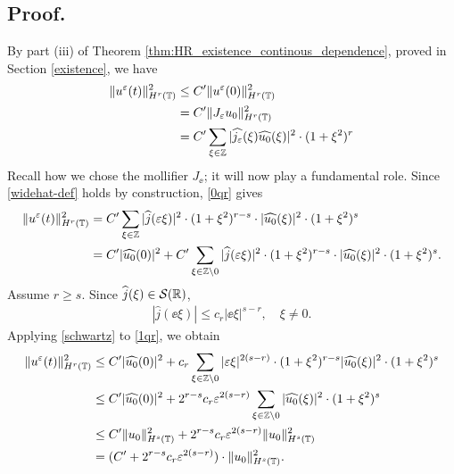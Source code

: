 \subsection{ Proof.} By part (iii) of Theorem
\ref{thm:HR_existence_continous_dependence}, proved in Section
\ref{existence}, we have
\begin{equation}
	\begin{split}
		\|u^\varepsilon(t) \|_{H^r(\mathbb{T})}^2
		& \le C' \|u^\varepsilon (0)\|_{H^r(\mathbb{T})}^2
		\\
		& = C' \|J_\varepsilon u_0\|_{H^r(\mathbb{T})}^2
		\\
		& = C' \sum_{\xi \in \mathbb{Z}} |\widehat{j_\varepsilon} (\xi) \widehat{u_0}(\xi)
		|^2 \cdot (1 + \xi^2)^r
		\label{0qr}
	\end{split}
\end{equation}
Recall how we chose the mollifier $J_\ee$; it will now play a fundamental role. Since
\eqref{widehat-def} holds by construction, \eqref{0qr} gives 
\begin{equation}
	\begin{split}
		\|u^\varepsilon(t) \|_{H^r(\mathbb{T})}^2
		& = C' \sum_{\xi \in \mathbb{Z}} |\widehat{j }(\varepsilon \xi)|^2 \cdot (1 +
		\xi^2)^{r-s} \cdot |\widehat{u_0}(\xi)|^2 \cdot (1 + \xi^2)^s
		\\
		& = C'|\widehat{u_0}(0)|^2 +
		C' \sum_{\xi \in \mathbb{Z} \setminus {0}} |\widehat{j }(\varepsilon \xi)|^2 \cdot (1 +
		\xi^2)^{r-s} \cdot |\widehat{u_0}(\xi)|^2 \cdot (1 + \xi^2)^s.
		\label{1qr}
	\end{split}
\end{equation}
Assume $r \ge s$. Since $\widehat{j }(\xi) \in \mathcal{S}(\mathbb{R})$, 
\begin{equation}
	\label{schwartz}
	\begin{split}
		|\widehat{j }(\ee \xi)| \le c_r |\ee \xi |^{s-r}, \quad \xi \neq 0.
	\end{split}
\end{equation}
Applying \eqref{schwartz} to \eqref{1qr}, we obtain
\begin{equation}
	\label{calc_ue}
	\begin{split}
		\|u^\varepsilon (t)\|_{H^r(\mathbb{T})}^2 
		& \le C' |\widehat{u_0}(0) |^2 + c_r \sum_{\xi \in \mathbb{Z} \setminus
		{0}} |\varepsilon \xi |^{2(s-r)} \cdot (1 + \xi^2)^{r-s}
		|\widehat{u_0}(\xi) |^2 \cdot (1 + \xi^2)^s
		\\
		& \le C' |\widehat{u_0}(0) |^2 + 2^{r-s} c_r \varepsilon^{2(s-r)}
		\sum_{\xi \in \mathbb{Z} \setminus {0}} |\widehat{u_0}(\xi)|^2 \cdot (1 +
		\xi^2)^s
		\\
		& \le C' \|u_0\|_{H^s(\mathbb{T})}^2 + 2^{r-s} c_r \varepsilon^{2(s-r)}
		\|u_0\|_{H^s(\mathbb{T})}^2
		\\
		& = (C' + 2^{r-s} c_r \varepsilon^{2(s-r)}) \cdot \|u_0\|^2_{H^s(\mathbb{T})}.
	\end{split}
\end{equation}
